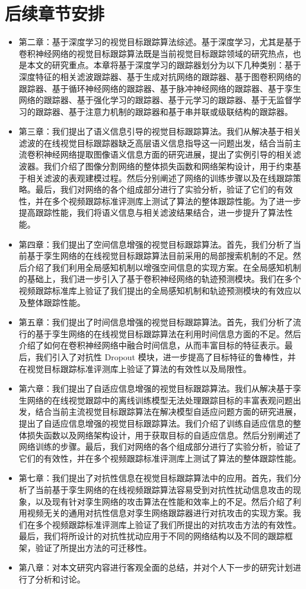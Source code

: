 \section{后续章节安排}
\begin{itemize}
\item 第二章：基于深度学习的视觉目标跟踪算法综述。基于深度学习，尤其是基于卷积神经网络的视觉目标跟踪算法既是当前视觉目标跟踪领域的研究热点，也是本文的研究重点。本章将基于深度学习的跟踪器划分为以下几种类别：基于深度特征的相关滤波跟踪器、基于生成对抗网络的跟踪器、基于图卷积网络的跟踪器、基于循环神经网络的跟踪器、基于脉冲神经网络的跟踪器、基于孪生网络的跟踪器、基于强化学习的跟踪器、基于元学习的跟踪器、基于无监督学习的跟踪器、基于注意力机制的跟踪器和基于串并联或级联结构的跟踪器。
\item 第三章：我们提出了语义信息引导的视觉目标跟踪算法。我们从解决基于相关滤波的在线视觉目标跟踪器缺乏高层语义信息指导这一问题出发，结合当前主流卷积神经网络提取图像语义信息方面的研究进展，提出了实例引导的相关滤波器。我们介绍了图像分割网络的整体损失函数和网络架构设计，用于约束基于相关滤波的表观建模过程。然后分别阐述了网络的训练步骤以及在线跟踪策略。最后，我们对网络的各个组成部分进行了实验分析，验证了它们的有效性，并在多个视频跟踪标准评测库上测试了算法的整体跟踪性能。为了进一步提高跟踪性能，我们将语义信息与相关滤波结果结合，进一步提升了算法性能。
\item 第四章：我们提出了空间信息增强的视觉目标跟踪算法。首先，我们分析了当前基于孪生网络的在线视觉目标跟踪算法目前采用的局部搜索机制的不足。然后介绍了我们利用全局感知机制以增强空间信息的实现方案。在全局感知机制的基础上，我们进一步引入了基于卷积神经网络的轨迹预测模块。我们在多个视频跟踪标准库上验证了我们提出的全局感知机制和轨迹预测模块的有效应以及整体跟踪性能。
\item 第五章：我们提出了时间信息增强的视觉目标跟踪算法。首先，我们分析了流行的基于孪生网络的在线视觉目标跟踪算法在利用时间信息方面的不足。然后介绍了如何在卷积神经网络中融合时间信息，从而丰富目标的特征表示。最后，我们引入了对抗性 Dropout 模块，进一步提高了目标特征的鲁棒性，并在视觉目标跟踪标准评测库上验证了算法的有效性以及局限性。
\item 第六章：我们提出了自适应信息增强的视觉目标跟踪算法。我们从解决基于孪生网络的在线视觉跟踪中的离线训练模型无法处理跟踪目标的丰富表观问题出发，结合当前主流视觉目标跟踪算法在解决模型自适应问题方面的研究进展，提出了自适应信息增强的视觉目标跟踪算法。我们介绍了训练自适应信息的整体损失函数以及网络架构设计，用于获取目标的自适应信息。然后分别阐述了网络训练的步骤。最后，我们对网络的各个组成部分进行了实验分析，验证了它们的有效性，并在多个视频跟踪标准评测库上测试了算法的整体跟踪性能。
\item 第七章：我们提出了对抗性信息在视觉目标跟踪算法中的应用。首先，我们分析了当前基于孪生网络的在线视频跟踪算法容易受到对抗性扰动信息攻击的现象，以及现有针对孪生网络的攻击算法在性能和效率上的不足。然后介绍了利用视频无关的通用对抗性信息对孪生网络跟踪器进行对抗攻击的实现方案。我们在多个视频跟踪标准评测库上验证了我们所提出的对抗攻击方法的有效性。最后，我们将所设计的对抗性扰动应用于不同的网络结构以及不同的跟踪框架，验证了所提出方法的可迁移性。
\item 第八章：对本文研究内容进行客观全面的总结，并对个人下一步的研究计划进行了分析和讨论。
\end{itemize}